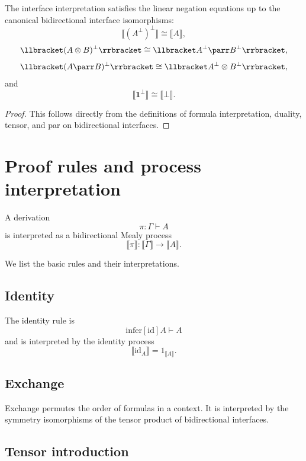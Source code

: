 \begin{proposition}
\label{prop:interface-semantics-demorgan}
The interface interpretation satisfies the linear negation equations up to the
canonical bidirectional interface isomorphisms:
\[
\llbracket (A^\bot)^\bot\rrbracket
\cong
\llbracket A\rrbracket,
\]
\[
\llbracket (A\otimes B)^\bot\rrbracket
\cong
\llbracket A^\bot\parr B^\bot\rrbracket,
\]
\[
\llbracket (A\parr B)^\bot\rrbracket
\cong
\llbracket A^\bot\otimes B^\bot\rrbracket,
\]
and
\[
\llbracket \mathbf 1^\bot\rrbracket
\cong
\llbracket \bot\rrbracket.
\]
\end{proposition}

\begin{proof}
This follows directly from the definitions of formula interpretation, duality,
tensor, and par on bidirectional interfaces.
\end{proof}

\section{Proof rules and process interpretation}
\label{sec:proof-rules-process-interpretation}

A derivation
\[
\pi:\Gamma\vdash A
\]
is interpreted as a bidirectional Mealy process
\[
\llbracket \pi\rrbracket:
\llbracket \Gamma\rrbracket
\to
\llbracket A\rrbracket.
\]

We list the basic rules and their interpretations.

\subsection{Identity}

The identity rule is
\[
\mathrm{infer}[\mathrm{id}]
      {A\vdash A}
      {}
\]
and is interpreted by the identity process
\[
\llbracket \mathrm{id}_A\rrbracket
=
1_{\llbracket A\rrbracket}.
\]

\subsection{Exchange}

Exchange permutes the order of formulas in a context.  It is interpreted by
the symmetry isomorphisms of the tensor product of bidirectional interfaces.

\subsection{Tensor introduction}

